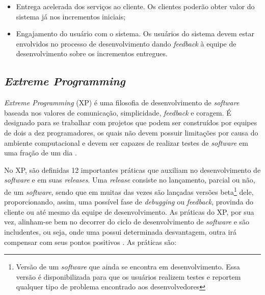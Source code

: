 \begin{itemize}
    \item Entrega acelerada dos serviços ao cliente. Os clientes poderão obter valor do sistema já nos incrementos iniciais;
    \item Engajamento do usuário com o sistema. Os usuários do sistema devem estar envolvidos no processo
    de desenvolvimento dando \textit{feedback} à equipe de desenvolvimento sobre os incrementos entregues.
\end{itemize}

    \subsection{\textit{Extreme Programming}}
    \textit{Extreme Programming} (XP) é uma filosofia de desenvolvimento de \textit{software} baseada nos valores de comunicação, simplicidade, \textit{feedback} e coragem. É designado para se trabalhar com projetos que podem ser
    construídos por equipes de dois a dez programadores, os quais não devem possuir limitações
    por causa do ambiente computacional e devem ser capazes de realizar testes de
    \textit{software} em uma fração de um dia \cite{beck_2004}.

    No XP, são definidas 12 importantes práticas que auxiliam no
    desenvolvimento de \textit{software} e em suas \textit{releases}.
    Uma \textit{release} consiste no lançamento, parcial ou não,
    de um \textit{software}, sendo que em muitas das vezes são
    lançadas versões beta\footnote{Versão de um \textit{software} que ainda se encontra em desenvolvimento. Essa versão é disponibilizada para que os usuários realizem testes e reportem qualquer tipo de problema encontrado aos desenvolvedores} dele, proporcionando, assim, uma possível
    fase de \textit{debugging} ou \textit{feedback}, provinda do
    cliente ou até mesmo da equipe de desenvolvimento. As práticas do XP, por sua vez, alinham-se bem no decorrer do ciclo de desenvolvimento de \textit{software} e são includentes, ou seja, onde uma possui determinada desvantagem, outra
    irá compensar com seus pontos positivos \cite{beck_2004}. As práticas são:

